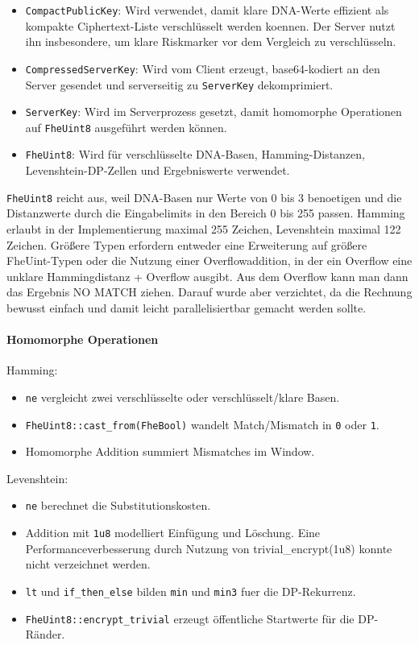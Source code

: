 \begin{itemize}
\item
  \texttt{CompactPublicKey}: Wird verwendet, damit klare DNA-Werte
  effizient als kompakte Ciphertext-Liste verschlüsselt werden koennen.
  Der Server nutzt ihn insbesondere, um klare Riskmarker vor dem
  Vergleich zu verschlüsseln.
\item
  \texttt{CompressedServerKey}: Wird vom Client erzeugt, base64-kodiert
  an den Server gesendet und serverseitig zu \texttt{ServerKey}
  dekomprimiert.
\item
  \texttt{ServerKey}: Wird im Serverprozess gesetzt, damit homomorphe
  Operationen auf \texttt{FheUint8} ausgeführt werden können.
\item
  \texttt{FheUint8}: Wird für verschlüsselte DNA-Basen,
  Hamming-Distanzen, Levenshtein-DP-Zellen und Ergebniswerte verwendet.
\end{itemize}

\texttt{FheUint8} reicht aus, weil DNA-Basen nur Werte von 0
bis 3 benoetigen und die Distanzwerte durch die Eingabelimits in den
Bereich 0 bis 255 passen. Hamming erlaubt in der Implementierung maximal 255 Zeichen, Levenshtein maximal 122 Zeichen. Größere Typen erfordern entweder eine Erweiterung auf größere FheUint-Typen oder die Nutzung einer Overflowaddition, in der ein Overflow eine unklare Hammingdistanz + Overflow ausgibt. Aus dem Overflow kann man dann das Ergebnis NO MATCH ziehen. Darauf wurde aber verzichtet, da die Rechnung bewusst einfach und damit leicht parallelisiertbar gemacht werden sollte.

\paragraph{Homomorphe Operationen}\label{homomorphe-operationen}

Hamming:

\begin{itemize}
\item
  \texttt{ne} vergleicht zwei verschlüsselte oder verschlüsselt/klare
  Basen.
\item
  \texttt{FheUint8::cast\_from(FheBool)} wandelt Match/Mismatch in
  \texttt{0} oder \texttt{1}.
\item
  Homomorphe Addition summiert Mismatches im Window.
\end{itemize}

Levenshtein:

\begin{itemize}
\item
  \texttt{ne} berechnet die Substitutionskosten.
\item
  Addition mit \texttt{1u8} modelliert Einfügung und Löschung. Eine Performanceverbesserung durch Nutzung von trivial\_encrypt(1u8) konnte nicht verzeichnet werden.
\item
  \texttt{lt} und \texttt{if\_then\_else} bilden \texttt{min} und
  \texttt{min3} fuer die DP-Rekurrenz.
\item
  \texttt{FheUint8::encrypt\_trivial} erzeugt öffentliche Startwerte
  für die DP-Ränder.
\end{itemize}

